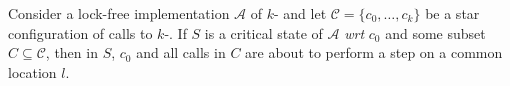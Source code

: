 
\begin{lemma}\label{lemma-critical}
Consider a lock-free implementation $\mathcal{A}$ of $k$-\cas{} and let $\mathcal{C} = \lbrace c_0, \dots ,c_k \rbrace$ be a star configuration of calls to $k$-\cas{}. If $S$ is a critical state of $\mathcal{A}$ \textit{wrt} $c_0$ and some subset $C\subseteq\mathcal{C}$, then in $S$, $c_0$ and all calls in $C$ are about to perform a \cas{} step on a common location $l$.
\end{lemma}
